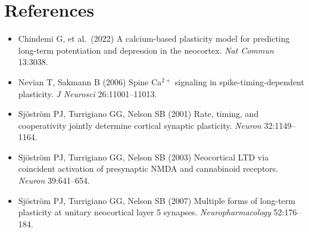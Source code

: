 \documentclass[11pt]{article}
\begin{document}
\section*{References}
\small
\begin{itemize}\setlength{\itemsep}{0pt}
\item Chindemi G, et al.\ (2022) A calcium-based plasticity model for predicting long-term potentiation and depression
      in the neocortex. \emph{Nat Commun} 13:3038.
\item Nevian T, Sakmann B (2006) Spine Ca$^{2+}$ signaling in spike-timing-dependent plasticity.
      \emph{J Neurosci} 26:11001--11013.
\item Sj\"ostr\"om PJ, Turrigiano GG, Nelson SB (2001) Rate, timing, and cooperativity jointly determine cortical
      synaptic plasticity. \emph{Neuron} 32:1149--1164.
\item Sj\"ostr\"om PJ, Turrigiano GG, Nelson SB (2003) Neocortical LTD via coincident activation of presynaptic NMDA
      and cannabinoid receptors. \emph{Neuron} 39:641--654.
\item Sj\"ostr\"om PJ, Turrigiano GG, Nelson SB (2007) Multiple forms of long-term plasticity at unitary neocortical
      layer 5 synapses. \emph{Neuropharmacology} 52:176--184.
\end{itemize}
\end{document}
